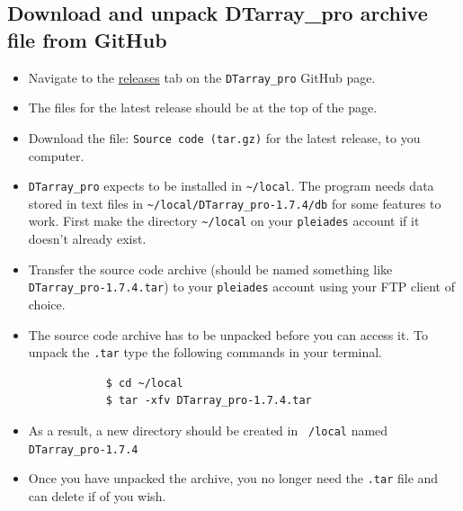 \documentclass[12pt]{article}
\newcommand{\VERSION}{1.7.4}
\begin{document}
	\subsection{Download and unpack DTarray\_pro archive file from GitHub}
	\begin{itemize}
		\item Navigate to the \href{https://github.com/ajmaurais/DTarray_pro/releases}{releases} tab on the \texttt{DTarray\_pro} GitHub page.
		
		\item The files for the latest release should be at the top of the page.
		
		\item Download the file: \texttt{Source code (tar.gz)} for the latest release, to you computer.
		
		\item \texttt{DTarray\_pro} expects to be installed in \texttt{\textasciitilde/local}. The program needs data stored in text files in \texttt{\textasciitilde/local/DTarray\_pro-\VERSION/db} for some features to work. First make the directory \texttt{\textasciitilde/local} on your \texttt{pleiades} account if it doesn't already exist.
		
		\item Transfer the source code archive (should be named something like \texttt{DTarray\_pro-\VERSION.tar}) to your \texttt{pleiades} account using your FTP client of choice.	
		
		\item The source code archive has to be unpacked before you can access it. To unpack the \texttt{.tar} type the following commands in your terminal.
		
		\begin{lstlisting}
			$ cd ~/local
			$ tar -xfv DTarray_pro-1.7.4.tar
		\end{lstlisting}
		
		\item As a result, a new directory should be created in \texttt{~/local} named \texttt{DTarray\_pro-\VERSION}
		
		\item Once you have unpacked the archive, you no longer need the \texttt{.tar} file and can delete if of you wish.
		
	\end{itemize}
\end{document}
